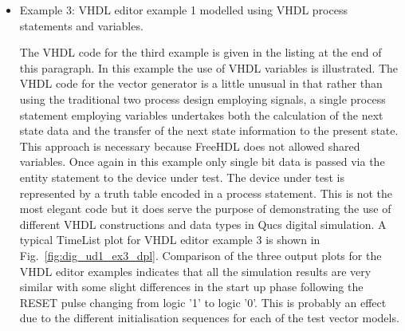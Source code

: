 \begin{itemize}
\item Example 3: VHDL editor example 1 modelled using VHDL process statements and variables.

The VHDL code for the third example is given in the listing at the end
of this paragraph.  In this example the use of VHDL variables is
illustrated.  The VHDL code for the vector generator is a little
unusual in that rather than using the traditional two process design
employing signals, a single process statement employing variables
undertakes both the calculation of the next state data and the
transfer of the next state information to the present state.  This
approach is necessary because FreeHDL does not allowed shared
variables. Once again in this example only single bit data is passed
via the entity statement to the device under test.  The device under
test is represented by a truth table encoded in a process statement.
This is not the most elegant code but it does serve the purpose of
demonstrating the use of different VHDL constructions and data types
in Qucs digital simulation. A typical TimeList plot for VHDL editor
example 3 is shown in Fig.~\ref{fig:dig_ud1_ex3_dpl}.  Comparison of
the three output plots for the VHDL editor examples indicates that all
the simulation results are very similar with some slight differences
in the start up phase following the RESET pulse changing from logic
'1' to logic '0'. This is probably an effect due to the different
initialisation sequences for each of the test vector models.


\end{itemize}
